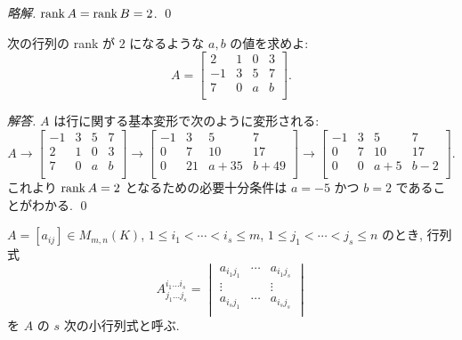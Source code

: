 \documentclass[12pt,twoside]{jarticle}
\newcommand\commentout[1]{#1}
\newcommand\commentout[1]{}
\begin{document}
\commentout{
\begin{proof}[略解]
  $\mathop{\mathrm{rank}}\nolimits A = \mathop{\mathrm{rank}}\nolimits B = 2$.
  \qed 
\end{proof}
}


\begin{question}
  \label{q:rank-2}
  次の行列の rank が $2$ になるような $a,b$ の値を求めよ:
  \begin{equation*}
    A = 
    \begin{bmatrix}
       2 & 1 & 0 & 3 \\
      -1 & 3 & 5 & 7 \\
       7 & 0 & a & b \\
    \end{bmatrix}.
  \end{equation*}
\end{question}

\commentout{
\begin{proof}[解答]
  $A$ は行に関する基本変形で次のように変形される:
  \begin{equation*}
    A \to
    \begin{bmatrix}
      -1 & 3 & 5 & 7 \\
       2 & 1 & 0 & 3 \\
       7 & 0 & a & b \\
    \end{bmatrix}
    \to 
    \begin{bmatrix}
      -1 &  3 &  5 &  7 \\
       0 &  7 & 10 & 17 \\
       0 & 21 & a + 35 & b + 49\\
    \end{bmatrix}
    \to 
    \begin{bmatrix}
      -1 &  3 &  5 &  7 \\
       0 &  7 & 10 & 17 \\
       0 &  0 & a + 5 & b -2 \\
    \end{bmatrix}.
  \end{equation*}
  これより $\mathop{\mathrm{rank}}\nolimits A=2$ となるための必要十分条件は $a=-5$ かつ $b=2$ であるこ
  とがわかる. \qed
\end{proof}
}


$A=[a_{ij}]\in M_{m,n}(K)$, 
$1\le i_1<\cdots<i_s\le m$, 
$1\le j_1<\cdots<j_s\le n$ のとき, 行列式
\begin{equation*}
  A^{i_1\ldots i_s}_{j_1\ldots j_s} = 
  \begin{vmatrix}
    a_{i_1j_1} & \cdots & a_{i_1j_s} \\
    \vdots     &        & \vdots \\
    a_{i_sj_1} & \cdots & a_{i_sj_s} \\
  \end{vmatrix}
\end{equation*}
を $A$ の $s$ 次の小行列式と呼ぶ.
\end{document}
